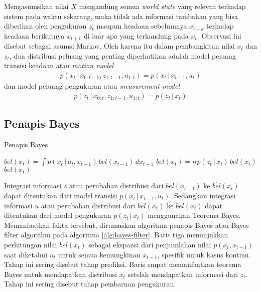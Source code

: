 Mengasumsikan nilai $X$ mengandung semua \textit{world state} yang relevan terhadap sistem pada waktu sekarang, maka tidak ada informasi tambahan yang bisa diberikan oleh pengukuran $z_t$ maupun keadaan sebelumnya $x_{t-k}$ terhadap keadaan berikutnya $x_{t+1}$ di luar apa yang terkandung pada $x_t$. Observasi ini disebut sebagai asumsi Markov. Oleh karena itu dalam pembangkitan nilai $x_t$ dan $z_t$, dua distribusi peluang yang penting diperhatikan adalah model peluang transisi keadaan atau \textit{motion model}
\begin{align}
    p(x_t \,|\, x_{0:t-1}, z_{1:t-1}, u_{1:t}) = p(x_t \,|\, x_{t-1}, u_t)
\end{align}
dan model peluang pengukuran atau \textit{measurement model}
\begin{align}
    p(z_t \,|\, x_{0:t}, z_{1:t-1}, u_{1:t}) = p(z_t \,|\, x_t)
\end{align}

\subsection{Penapis Bayes}

\begin{algorithm}
    \caption{Penapis Bayes}
    \label{alg:bayes-filter}
    \begin{algorithmic}[1]
        \State $\overline{bel}(x_t) = \int p(x_t \,|\, u_t, x_{t-1})\, bel(x_{t-1})\, dx_{t-1}$
        \State $bel(x_t) = \eta\, p(z_t \,|\, x_t)\, \overline{bel}(x_t)$ 
        \EndFor
        \State \Return $bel(x_t)$
        \EndFunction
    \end{algorithmic}
\end{algorithm}

Integrasi informasi $z$ atau perubahan distribusi dari $bel(x_{t-1})$ ke $\overline{bel}(x_t)$ dapat ditentukan dari model transisi $p(x_t \,|\, x_{t-1}, u_t)$. Sedangkan integrasi informasi $u$ atau perubahan distribusi dari $\overline{bel}(x_t)$ ke $bel(x_t)$ dapat ditentukan dari model pengukuran $p(z_t \,|\, x_t)$ menggunakan Teorema Bayes. Memanfaatkan fakta tersebut, dirumuskan algoritma penapis Bayes atau Bayes filter algorithm pada algoritma \ref{alg:bayes-filter}. Baris tiga menunjukkan perhitungan nilai $bel(x_t)$ sebagai ekspansi dari penjumlahan nilai $p(x_t, x_{t-1})$ saat diketahui $u_t$ untuk semua kemungkinan $x_{t-1}$, spesifik untuk kasus kontinu. Tahap ini sering disebut tahap prediksi. Baris empat memanfaatkan teorema Bayes untuk mendapatkan distribusi $x_t$ setelah mendapatkan informasi dari $z_t$. Tahap ini sering disebut tahap pembaruan pengukuran.

